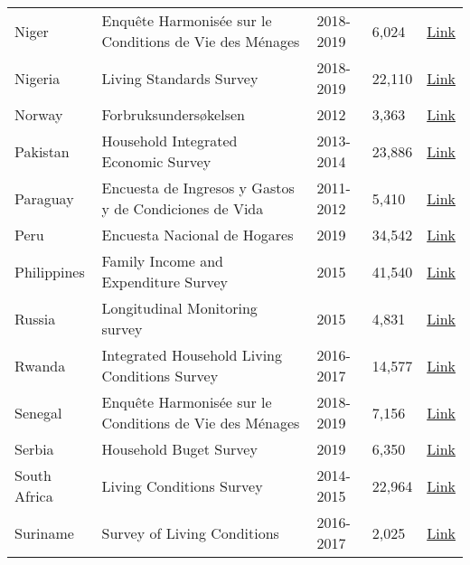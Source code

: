 \begin{ThreePartTable}
\begin{longtable}[t]{l|p{8cm}|l|l|l}
        Niger & Enquête Harmonisée sur le Conditions de Vie des Ménages & 2018-2019 &  6,024  & \href{https://microdata.worldbank.org/index.php/catalog/4296}{Link} \\ 
        Nigeria & Living Standards Survey & 2018-2019 &  22,110  & \href{https://microdata.worldbank.org/index.php/catalog/5835}{Link} \\ 
        Norway & Forbruksundersøkelsen & 2012 &  3,363  & \href{https://www.ssb.no/inntekt-og-forbruk/artikler-og-publikasjoner/forbruksundersokelsen-2012}{Link} \\ 
        Pakistan & Household Integrated Economic Survey & 2013-2014 &  23,886  & \href{https://www.pbs.gov.pk/publication/household-integrated-economic-survey-hies-2018-19}{Link} \\ 
        Paraguay & Encuesta de Ingresos y Gastos y de Condiciones de Vida & 2011-2012 &  5,410  & \href{https://www.ine.gov.py/microdatos/microdatos.php}{Link} \\ 
        Peru & Encuesta Nacional de Hogares & 2019 &  34,542  & \href{https://www.datosabiertos.gob.pe/dataset/encuesta-nacional-de-hogares-enaho-2019-instituto-nacional-de-estad\%C3\%ADstica-e-inform\%C3\%A1tica-inei}{Link} \\ 
        Philippines & Family Income and Expenditure Survey & 2015 &  41,540  & \href{https://rssoncr.psa.gov.ph/fies}{Link} \\ 
        Russia & Longitudinal Monitoring survey & 2015 &  4,831  & \href{https://www.hse.ru/en/rlms/availability }{Link} \\ 
        Rwanda & Integrated Household Living Conditions Survey & 2016-2017 &  14,577  & \href{https://www.statistics.gov.rw/datasource/integrated-household-living-conditions-survey-eicv}{Link} \\ 
        Senegal & Enquête Harmonisée sur le Conditions de Vie des Ménages & 2018-2019 &  7,156  & \href{https://microdata.worldbank.org/index.php/catalog/4297}{Link} \\ 
        Serbia & Household Buget Survey & 2019 &  6,350  & \href{https://data.stat.gov.rs/?caller=0101\&languageCode=en-US}{Link} \\ 
        South Africa & Living Conditions Survey & 2014-2015 &  22,964  & \href{https://microdata.worldbank.org/index.php/catalog/2882}{Link} \\ 
        Suriname & Survey of Living Conditions & 2016-2017 &  2,025  & \href{https://www.ilo.org/surveyLib/index.php/catalog/7499}{Link} \\ 

\end{longtable}
\end{ThreePartTable}

